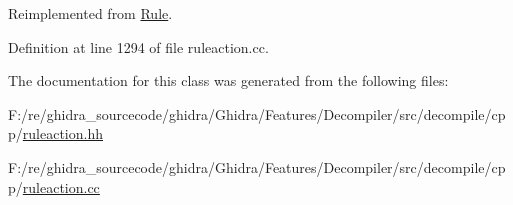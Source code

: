 Reimplemented from \mbox{\hyperlink{class_rule_a4023bfc7825de0ab866790551856d10e}{Rule}}.



Definition at line 1294 of file ruleaction.\+cc.



The documentation for this class was generated from the following files\+:\begin{DoxyCompactItemize}
\item 
F\+:/re/ghidra\+\_\+sourcecode/ghidra/\+Ghidra/\+Features/\+Decompiler/src/decompile/cpp/\mbox{\hyperlink{ruleaction_8hh}{ruleaction.\+hh}}\item 
F\+:/re/ghidra\+\_\+sourcecode/ghidra/\+Ghidra/\+Features/\+Decompiler/src/decompile/cpp/\mbox{\hyperlink{ruleaction_8cc}{ruleaction.\+cc}}\end{DoxyCompactItemize}
